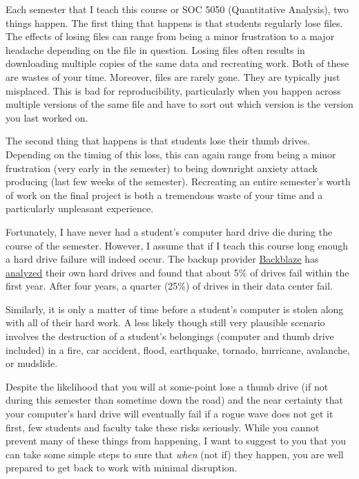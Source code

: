 \documentclass[]{book}
\begin{document}
Each semester that I teach this course or SOC 5050 (Quantitative
Analysis), two things happen. The first thing that happens is that
students regularly lose files. The effects of losing files can range
from being a minor frustration to a major headache depending on the file
in question. Losing files often results in downloading multiple copies
of the same data and recreating work. Both of these are wastes of your
time. Moreover, files are rarely gone. They are typically just
misplaced. This is bad for reproducibility, particularly when you happen
across multiple versions of the same file and have to sort out which
version is the version you last worked on.

The second thing that happens is that students lose their thumb drives.
Depending on the timing of this loss, this can again range from being a
minor frustration (very early in the semester) to being downright
anxiety attack producing (last few weeks of the semester). Recreating an
entire semester's worth of work on the final project is both a
tremendous waste of your time and a particularly unpleasant experience.

Fortunately, I have never had a student's computer hard drive die during
the course of the semester. However, I assume that if I teach this
course long enough a hard drive failure will indeed occur. The backup
provider \href{https://www.backblaze.com/}{Backblaze} has
\href{https://www.backblaze.com/blog/how-long-do-disk-drives-last/}{analyzed}
their own hard drives and found that about 5\% of drives fail within the
first year. After four years, a quarter (25\%) of drives in their data
center fail.

Similarly, it is only a matter of time before a student's computer is
stolen along with all of their hard work. A less likely though still
very plausible scenario involves the destruction of a student's
belongings (computer and thumb drive included) in a fire, car accident,
flood, earthquake, tornado, hurricane, avalanche, or mudslide.

Despite the likelihood that you will at some-point lose a thumb drive
(if not during this semester than sometime down the road) and the near
certainty that your computer's hard drive will eventually fail if a
rogue wave does not get it first, few students and faculty take these
risks seriously. While you cannot prevent many of these things from
happening, I want to suggest to you that you can take some simple steps
to sure that \emph{when} (not if) they happen, you are well prepared to
get back to work with minimal disruption.
\end{document}
